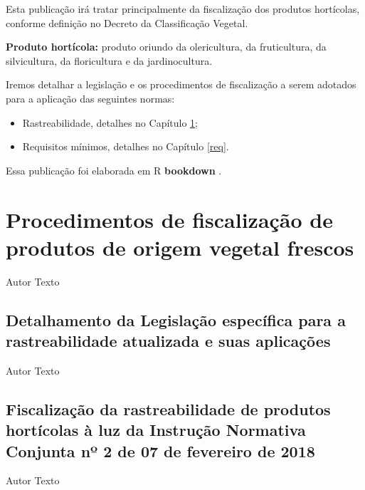 \documentclass[
]{book}
\providecommand{\tightlist}{%
  \setlength{\itemsep}{0pt}\setlength{\parskip}{0pt}}
\begin{document}
Esta publicação irá tratar principalmente da fiscalização dos produtos hortícolas, conforme definição no Decreto da Classificação Vegetal.

\textbf{Produto hortícola:} produto oriundo da olericultura, da fruticultura, da silvicultura, da floricultura e da jardinocultura.

Iremos detalhar a legislação e os procedimentos de fiscalização a serem adotados para a aplicação das seguintes normas:

\begin{itemize}
\tightlist
\item
  Rastreabilidade, detalhes no Capítulo \ref{rastr};
\item
  Requisitos mínimos, detalhes no Capítulo \ref{req}.
\end{itemize}

Essa publicação foi elaborada em R \textbf{bookdown} \citep{xie2015}.

\hypertarget{rastr}{%
\chapter{Procedimentos de fiscalização de produtos de origem vegetal frescos}\label{rastr}}

Autor
Texto

\hypertarget{detalhamento-da-legislauxe7uxe3o-especuxedfica-para-a-rastreabilidade-atualizada-e-suas-aplicauxe7uxf5es}{%
\section{Detalhamento da Legislação específica para a rastreabilidade atualizada e suas aplicações}\label{detalhamento-da-legislauxe7uxe3o-especuxedfica-para-a-rastreabilidade-atualizada-e-suas-aplicauxe7uxf5es}}

Autor
Texto

\hypertarget{fiscalizauxe7uxe3o-da-rastreabilidade-de-produtos-hortuxedcolas-uxe0-luz-da-instruuxe7uxe3o-normativa-conjunta-nuxba-2-de-07-de-fevereiro-de-2018}{%
\section{Fiscalização da rastreabilidade de produtos hortícolas à luz da Instrução Normativa Conjunta nº 2 de 07 de fevereiro de 2018}\label{fiscalizauxe7uxe3o-da-rastreabilidade-de-produtos-hortuxedcolas-uxe0-luz-da-instruuxe7uxe3o-normativa-conjunta-nuxba-2-de-07-de-fevereiro-de-2018}}

Autor
Texto
\end{document}
